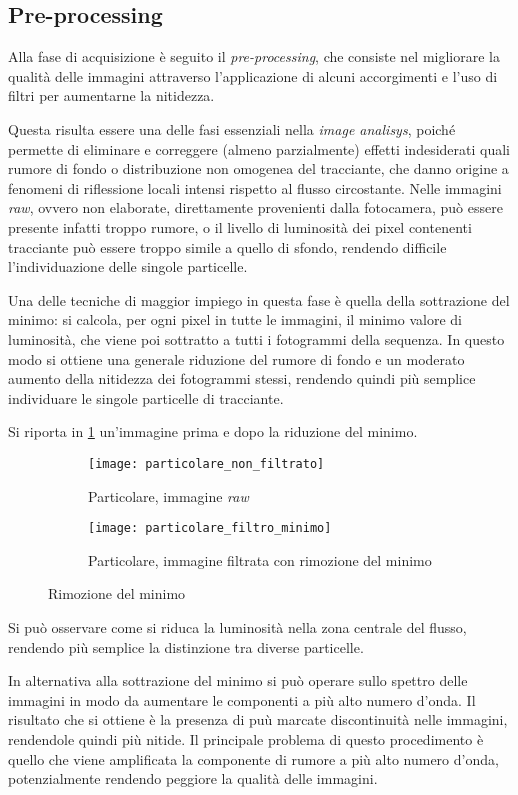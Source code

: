 \documentclass{article} %
\begin{document}
\subsection{Pre-processing}
Alla fase di acquisizione è seguito il \textit{pre-processing}, che consiste nel migliorare la qualità delle immagini attraverso l'applicazione di alcuni accorgimenti e l'uso di filtri per aumentarne la nitidezza.\par
Questa risulta essere una delle fasi essenziali nella \textit{image analisys}, poiché permette di eliminare e correggere (almeno parzialmente) effetti indesiderati quali rumore di fondo o distribuzione non omogenea del tracciante, che danno origine a fenomeni di riflessione locali intensi rispetto al flusso circostante. Nelle immagini \textit{raw}, ovvero non elaborate, direttamente provenienti dalla fotocamera, può essere presente infatti troppo rumore, o il livello di luminosità dei pixel contenenti tracciante può essere troppo simile a quello di sfondo, rendendo difficile l'individuazione delle singole particelle.\par
Una delle tecniche di maggior impiego in questa fase è quella della sottrazione del minimo: si calcola, per ogni pixel in tutte le immagini, il minimo valore di luminosità, che viene poi sottratto a tutti i fotogrammi della sequenza. In questo modo si ottiene una generale riduzione del rumore di fondo e un moderato aumento della nitidezza dei fotogrammi stessi, rendendo quindi più semplice individuare le singole particelle di tracciante.\par
Si riporta in \cref{fig:minimo} un'immagine prima e dopo la riduzione del minimo.
\begin{figure}[h!]
	\centering
    \begin{subfigure}{0.45\textwidth}
        \texttt{[image: particolare\_non\_filtrato]}
        \caption{Particolare, immagine \textit{raw}}
    \end{subfigure}\qquad
    \begin{subfigure}{0.45\textwidth}
        \texttt{[image: particolare\_filtro\_minimo]}   
        \caption{Particolare, immagine filtrata con rimozione del minimo}     
    \end{subfigure}
    \caption{Rimozione del minimo}
    \label{fig:minimo}  
\end{figure}\par
Si può osservare come si riduca la luminosità nella zona centrale del flusso, rendendo più semplice la distinzione tra diverse particelle.\par
In alternativa alla sottrazione del minimo si può operare sullo spettro delle immagini in modo da aumentare le componenti a più alto numero d'onda. Il risultato che si ottiene è la presenza di puù marcate discontinuità nelle immagini, rendendole quindi più nitide. Il principale problema di questo procedimento è quello che viene amplificata la componente di rumore a più alto numero d'onda, potenzialmente rendendo peggiore la qualità delle immagini.
\end{document}
